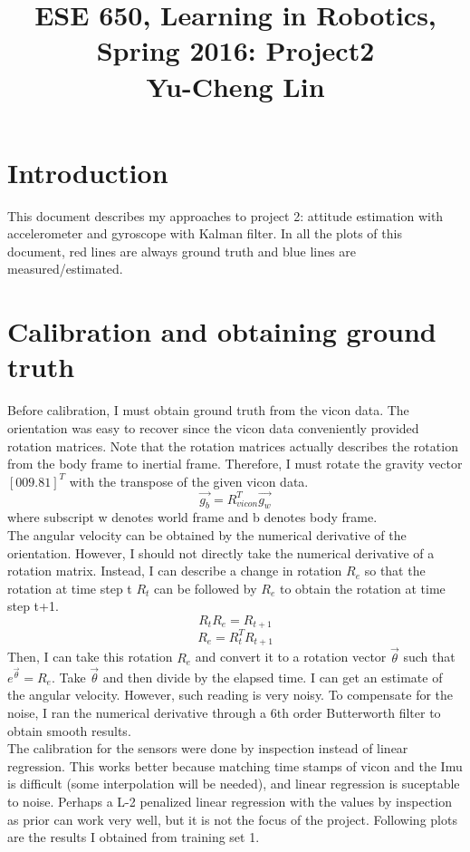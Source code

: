 \documentclass[english]{article}
\title{ESE 650, Learning in Robotics, Spring 2016: Project2 \\
Yu-Cheng Lin}
\date{}
\begin{document}
\maketitle
\section*{Introduction}
This document describes my approaches to project 2: attitude estimation with accelerometer and gyroscope with Kalman filter. In all the plots of this document, red lines are always ground truth and blue lines are measured/estimated.
\section*{Calibration and obtaining ground truth}
Before calibration, I must obtain ground truth from the vicon data. The orientation was easy to recover since the vicon data conveniently provided rotation matrices. Note that the rotation matrices actually describes the rotation from the body frame to inertial frame. Therefore, I must rotate the gravity vector $[0 0 9.81]^T$ with the transpose of the given vicon data.
\[\overrightarrow{g_b} = R_{vicon}^T\overrightarrow{g_w} \]
where subscript w denotes world frame and b denotes body frame.\\
The angular velocity can be obtained by the numerical derivative of the orientation. However, I should not directly take the numerical derivative of a rotation matrix. Instead, I can describe a change in rotation $R_e$ so that the rotation at time step t $R_t$ can be followed by $R_e$ to obtain the rotation at time step t+1.
\[ R_tR_e = R_{t+1} \]
\[R_e = R_t^TR_{t+1} \]
Then, I can take this rotation $R_e$ and convert it to a rotation vector $\overrightarrow{\theta}$ such that $e^{\overrightarrow{\theta}} = R_e$. Take $\overrightarrow{\theta}$ and then divide by the elapsed time. I can get an estimate of the angular velocity. However, such reading is very noisy. To compensate for the noise, I ran the numerical derivative through a 6th order Butterworth filter to obtain smooth results.\\
The calibration for the sensors were done by inspection instead of linear regression. This works better because matching time stamps of vicon and the Imu is difficult (some interpolation will be needed), and linear regression is suceptable to noise. Perhaps a L-2 penalized linear regression with the values by inspection as prior can work very well, but it is not the focus of the project. Following plots are the results I obtained from training set 1.
\end{document}
